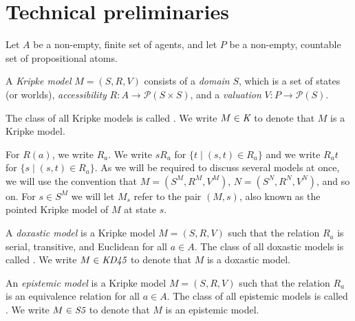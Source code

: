 \chapter{Technical preliminaries}



Let $A$ be a non-empty, finite set of agents, and let $P$ be a non-empty,
countable set of propositional atoms.

\begin{definition}
A \textit{Kripke model} $M = (S, R, V)$ consists of a \textit{domain} $S$, which
is a set of states (or worlds), \textit{accessibility} $R : A \to \mathcal{P}(S
\times S)$, and a \textit{valuation} $V : P \to \mathcal{P}(S)$. 

The class of all Kripke models is called \classK{}. We write $M \in \textit{K}{}$
to denote that $M$ is a Kripke model.
\end{definition}

For $R(a)$, we write $R_a$. We write $sR_a$ for $\{t \mid (s, t) \in R_a\}$ and
we write $R_at$ for $\{s \mid (s, t) \in R_a\}$. As we will be required to
discuss several models at once, we will use the convention that $M = (S^M, R^M,
V^M)$, $N = (S^N, R^N, V^N)$, and so on. For $s \in S^M$ we will let $M_s$ refer
to the pair $(M, s)$, also known as the pointed Kripke model of $M$ at state
$s$.

\begin{definition}
A \textit{doxastic model} is a Kripke model $M = (S, R, V)$ such that the
relation $R_a$ is serial, transitive, and Euclidean for all $a \in A$. The class
of all doxastic models is called \classKD{}. We write $M \in \textit{KD45}{}$ to
denote that $M$ is a doxastic model.
\end{definition}

\begin{definition}
An \textit{epistemic model} is a Kripke model $M = (S, R, V)$ such that the
relation $R_a$ is an equivalence relation for all $a \in A$. The class of all
epistemic models is called \classS{}. We write $M \in \textit{S5}{}$ to denote that
$M$ is an epistemic model.
\end{definition}

